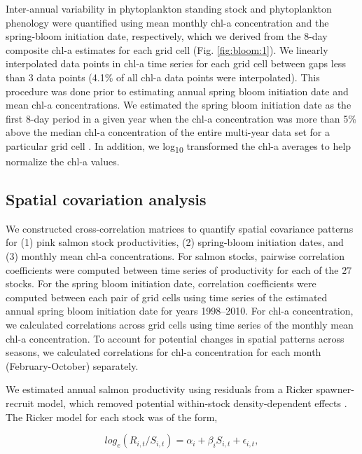 Inter-annual variability in phytoplankton standing stock and phytoplankton
phenology were quantified using mean monthly chl-a concentration and the
spring-bloom initiation date, respectively, which we derived from the 8-day
composite chl-a estimates for each grid cell (Fig. \ref{fig:bloom:1}). We
linearly interpolated data points in chl-a time series for each grid cell
between gaps less than 3 data points (4.1\% of all chl-a data points were
interpolated). This procedure was done prior to estimating annual spring bloom
initiation date and mean chl-a concentrations. We estimated the spring bloom
initiation date as the first 8-day period in a given year when the chl-a
concentration was more than 5\% above the median chl-a concentration of the
entire multi-year data set for a particular grid cell \citep{Siegel2002a,
Henson2007a}. In addition, we log\textsubscript{10} transformed the chl-a
averages to help normalize the chl-a values.


\subsection{Spatial covariation analysis}

We constructed cross-correlation matrices to quantify spatial covariance
patterns for (1) pink salmon stock productivities, (2) spring-bloom initiation
dates, and (3) monthly mean chl-a concentrations. For salmon stocks, pairwise
correlation coefficients were computed between time series of productivity for
each of the 27 stocks. For the spring bloom initiation date, correlation
coefficients were computed between each pair of grid cells using time series of
the estimated annual spring bloom initiation date for years 1998--2010. For chl-a
concentration, we calculated correlations across grid cells using time series of
the monthly mean chl-a concentration. To account for potential changes in
spatial patterns across seasons, we calculated correlations for chl-a
concentration for each month (February-October) separately.

We estimated annual salmon productivity using residuals from a Ricker
spawner-recruit model, which removed potential within-stock density-dependent
effects \citep{Pyper2001a, Mueter2002a, Ricker1954a}.  The Ricker model for each
stock was of the form,

\begin{equation}
log_e(R_{i,t} / S_{i,t}) = \alpha_i + \beta_i S_{i,t} + \epsilon_{i,t},
\label{eq:bloom:1}
\end{equation}

